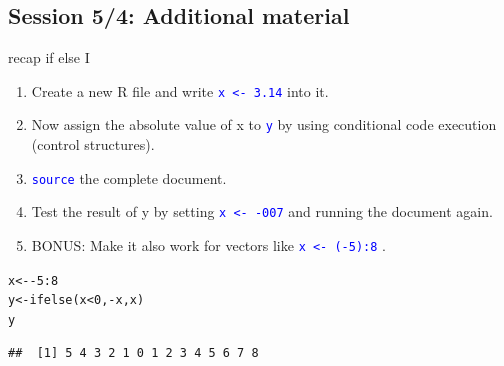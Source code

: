 \documentclass[xcolor=table,           xcolor=dvipsnames]{beamer}\usepackage[]{graphicx}\usepackage[]{color}
\makeatletter
\newcommand{\hlnum}[1]{\textcolor[rgb]{0,0,0}{#1}}
\newcommand{\hlopt}[1]{\textcolor[rgb]{0,0,0}{#1}}
\newcommand{\hlstd}[1]{\textcolor[rgb]{0,0,0}{#1}}
\newcommand{\hlkwb}[1]{\textcolor[rgb]{0,0,0}{#1}}
\newcommand{\hlkwd}[1]{\textcolor[rgb]{0,0,1}{#1}}
\newenvironment{kframe}{%
 \def\at@end@of@kframe{}%
 \ifinner\ifhmode%
  \def\at@end@of@kframe{\end{minipage}}%
  \begin{minipage}{\columnwidth}%
 \fi\fi%
 \def\FrameCommand##1{\hskip\@totalleftmargin \hskip-\fboxsep
 \colorbox{shadecolor}{##1}\hskip-\fboxsep
     \hskip-\linewidth \hskip-\@totalleftmargin \hskip\columnwidth}%
 \MakeFramed {\advance\hsize-\width
   \@totalleftmargin\z@ \linewidth\hsize
   \@setminipage}}%
 {\par\unskip\endMakeFramed%
 \at@end@of@kframe}
\newenvironment{knitrout}{}{} %
\newcommand{\rcode}[1]{\texttt{\textcolor{Blue}{#1}}} %
\makeatother
\begin{document}
\subsection{Session 5/4: Additional material}

\begin{frame}[fragile]{recap \alert{if else} I}
\begin{enumerate}
\item Create a new R file and write \rcode{x <- 3.14} into it.
\item Now  assign the absolute value of x to \rcode{y} by using conditional code execution (control structures).
\item \rcode{source} the complete document.
\item Test the result of y by setting \rcode{x <- -007} and running the document again.
\item BONUS: Make it also work for vectors like \rcode{x <- (-5):8} .
\end{enumerate}
\pause
\begin{knitrout}
\color{fgcolor}\begin{kframe}
\begin{alltt}
\hlstd{x} \hlkwb{<-} \hlopt{-}\hlnum{5}\hlopt{:}\hlnum{8}
\hlstd{y} \hlkwb{<-} \hlkwd{ifelse}\hlstd{(x}\hlopt{<}\hlnum{0}\hlstd{,} \hlopt{-}\hlstd{x, x)}
\hlstd{y}
\end{alltt}
\begin{verbatim}
##  [1] 5 4 3 2 1 0 1 2 3 4 5 6 7 8
\end{verbatim}
\end{kframe}
\end{knitrout}
\end{frame}

\end{document}
